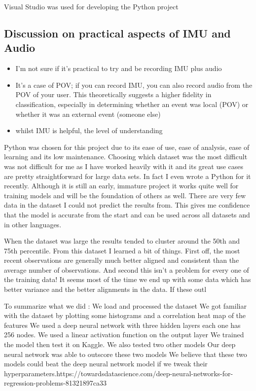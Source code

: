 \documentclass{UoNMCHA}
\numberwithin{equation}{section}
\begin{document}
Visual Studio was used for developing the Python project

\subsection{Discussion on practical aspects of IMU and Audio}

\begin{itemize}
    \item I'm not sure if it's practical to try and be recording IMU plus audio
    \item It's a case of POV; if you can record IMU, you can also record audio from the POV of your user. This theoretically suggests a higher fidelity in classification, especially in determining whether an event was local (POV) or whether it was an external event (someone else)
    \item whilst IMU is helpful, the level of understanding
\end{itemize}

Python was chosen for this project due to its ease of use, ease of analysis, ease of learning and its low maintenance. Choosing which dataset was the most difficult was not difficult for me as I have worked heavily with it and its great use cases are pretty straightforward for large data sets. In fact I even wrote a Python for it recently. Although it is still an early, immature project it works quite well for training models and will be the foundation of others as well. There are very few data in the dataset I could not predict the results from. This gives me confidence that the model is accurate from the start and can be used across all datasets and in other languages.

When the dataset was large the results tended to cluster around the 50th and 75th percentile. From this dataset I learned a bit of things. First off, the most recent observations are generally much better aligned and consistent than the average number of observations. And second this isn't a problem for every one of the training data! It seems most of the time we end up with some data which has better variance and the better alignments in the data. If these outl





To summarize what we did :
We load and processed the dataset
We got familiar with the dataset by plotting some histograms and a correlation heat map of the features
We used a deep neural network with three hidden layers each one has 256 nodes.
We used a linear activation function on the output layer
We trained the model then test it on Kaggle.
We also tested two other models
Our deep neural network was able to outscore these two models
We believe that these two models could beat the deep neural network model if we tweak their hyperparameters.https://towardsdatascience.com/deep-neural-networks-for-regression-problems-81321897ca33
\end{document}
